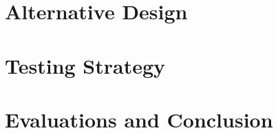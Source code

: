 \documentclass[11pt,twocolumn]{article}
\begin{document}
\section{Alternative Design}

\section{Testing Strategy}

\section{Evaluations and Conclusion}
\end{document}
